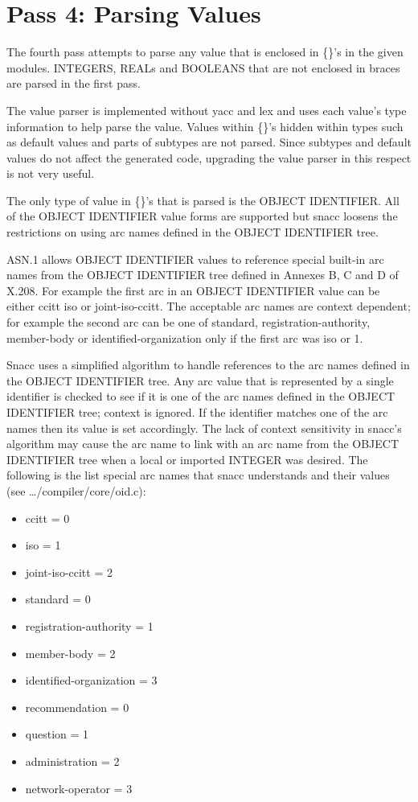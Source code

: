 \section{\label{comp-pass4-section}Pass 4: Parsing Values}
The fourth pass attempts to parse any value that is enclosed in \{\}'s in
the given modules.  INTEGERS, REALs and BOOLEANS that are not enclosed in
braces are parsed in the first pass.

The value parser is implemented without {\ufn yacc} and {\ufn lex} and
uses each value's type information to help parse the value.  Values
within \{\}'s hidden within types such as default values and parts of
subtypes are not parsed.  Since subtypes and default values do not
affect the generated code, upgrading the value parser in this respect
is not very useful.

The only type of value in \{\}'s that is parsed is the OBJECT
IDENTIFIER\@.  All of the OBJECT IDENTIFIER value forms are supported
but snacc loosens the restrictions on using arc names defined in the
OBJECT IDENTIFIER tree.

ASN.1 allows OBJECT IDENTIFIER values to reference special built-in
arc names from the OBJECT IDENTIFIER tree defined in Annexes B, C and
D of X.208.  For example the first arc in an OBJECT IDENTIFIER value
can be either {\ASN ccitt} {\ASN iso} or {\ASN joint-iso-ccitt}.  The
acceptable arc names are context dependent; for example the second arc
can be one of {\ASN standard}, {\ASN registration-authority},
{\ASN member-body} or {\ASN identified-organization} only if the first
arc was {\ASN iso} or 1.

Snacc uses a simplified algorithm to handle references to the arc
names defined in the OBJECT IDENTIFIER tree.  Any arc value that is
represented by a single identifier is checked to see if it is one of
the arc names defined in the OBJECT IDENTIFIER tree; context is
ignored.  If the identifier matches one of the arc names then its
value is set accordingly.  The lack of context sensitivity in snacc's
algorithm may cause the arc name to link with an arc name from the
OBJECT IDENTIFIER tree when a local or imported INTEGER was desired.
The following is the list special arc names that snacc understands and
their values (see {\ufn \dots/compiler/core/oid.c}):

\begin{itemize}
\setlength{\itemsep}{0pt}
\setlength{\parsep}{0pt}
\item {ccitt = 0}
\item {iso = 1}
\item {joint-iso-ccitt = 2}
\item {standard = 0}
\item {registration-authority = 1}
\item {member-body = 2}
\item {identified-organization = 3}
\item {recommendation = 0}
\item {question = 1}
\item {administration = 2}
\item {network-operator = 3}
\end{itemize}

